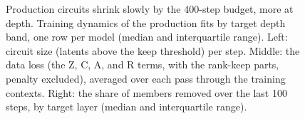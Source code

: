 
\begin{figure}[tbp]
\centering
\caption{Production circuits shrink slowly by the 400-step budget, more at depth.
Training dynamics of the production fits by target depth band, one row per model (median and interquartile range).
Left: circuit size (latents above the keep threshold) per step.
Middle: the data loss (the Z, C, A, and R terms, with the rank-keep parts, penalty excluded), averaged over each pass through the training contexts.
Right: the share of members removed over the last 100 steps, by target layer (median and interquartile range).}
\label{fig:run2026-training-curves}
\end{figure}
